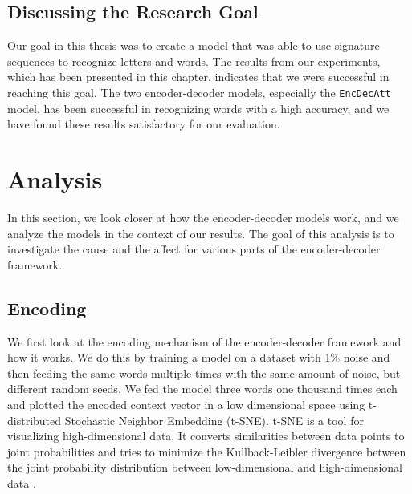 \subsection{Discussing the Research Goal}
Our goal in this thesis was to create a model that was able to use signature sequences to recognize letters and words. The results from our experiments, which has been presented in this chapter, indicates that we were successful in reaching this goal. The two encoder-decoder models, especially the {\tt EncDecAtt} model, has been successful in recognizing words with a high accuracy, and we have found these results satisfactory for our evaluation.


\section{Analysis}
\label{sec:reasoning}
In this section, we look closer at how the encoder-decoder models work, and we analyze the models in the context of our results. The goal of this analysis is to investigate the cause and the affect for various parts of the encoder-decoder framework.

\subsection{Encoding}
We first look at the encoding mechanism of the encoder-decoder framework and how it works. We do this by training a model on a dataset with 1\% noise and then feeding the same words multiple times with the same amount of noise, but different random seeds. We fed the model three words one thousand times each and plotted the encoded context vector in a low dimensional space using t-distributed Stochastic Neighbor Embedding (t-SNE). t-SNE is a tool for visualizing high-dimensional data. It converts similarities between data points to joint probabilities and tries to minimize the Kullback-Leibler divergence between the joint probability distribution between low-dimensional and high-dimensional data \citep{maaten2008visualizing}.

